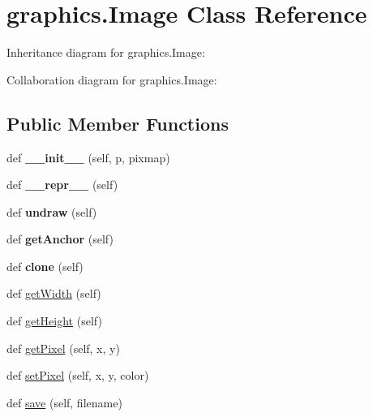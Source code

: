 \hypertarget{classgraphics_1_1Image}{}\section{graphics.\+Image Class Reference}
\label{classgraphics_1_1Image}


Inheritance diagram for graphics.\+Image\+:


Collaboration diagram for graphics.\+Image\+:
\subsection*{Public Member Functions}
\begin{DoxyCompactItemize}
\item 
def {\bfseries \+\_\+\+\_\+init\+\_\+\+\_\+} (self, p, pixmap)\hypertarget{classgraphics_1_1Image_a0e82c34ead99ecc7e8bd19f8d073c135}{}\label{classgraphics_1_1Image_a0e82c34ead99ecc7e8bd19f8d073c135}

\item 
def {\bfseries \+\_\+\+\_\+repr\+\_\+\+\_\+} (self)\hypertarget{classgraphics_1_1Image_a6dc7689939ebef91fbce7ff60b190a32}{}\label{classgraphics_1_1Image_a6dc7689939ebef91fbce7ff60b190a32}

\item 
def {\bfseries undraw} (self)\hypertarget{classgraphics_1_1Image_a012595b97cd10d26b7fa2f0f0460d169}{}\label{classgraphics_1_1Image_a012595b97cd10d26b7fa2f0f0460d169}

\item 
def {\bfseries get\+Anchor} (self)\hypertarget{classgraphics_1_1Image_a7f5afb0cad91db822c5074255eb53f04}{}\label{classgraphics_1_1Image_a7f5afb0cad91db822c5074255eb53f04}

\item 
def {\bfseries clone} (self)\hypertarget{classgraphics_1_1Image_a4ade7cc782c157e45fa9b516fe6a3a98}{}\label{classgraphics_1_1Image_a4ade7cc782c157e45fa9b516fe6a3a98}

\item 
def \hyperlink{classgraphics_1_1Image_aff8e62ceeb4265e4d17ce852903c9ae3}{get\+Width} (self)
\item 
def \hyperlink{classgraphics_1_1Image_ab092ccc35755f176309971023f912d67}{get\+Height} (self)
\item 
def \hyperlink{classgraphics_1_1Image_a69deca3f65e378be239eb1ba837d06f8}{get\+Pixel} (self, x, y)
\item 
def \hyperlink{classgraphics_1_1Image_a73fb3ce4de03fe9f57c076d739712378}{set\+Pixel} (self, x, y, color)
\item 
def \hyperlink{classgraphics_1_1Image_ace518e9286a3bc0f81c7f1029c394104}{save} (self, filename)
\end{DoxyCompactItemize}
